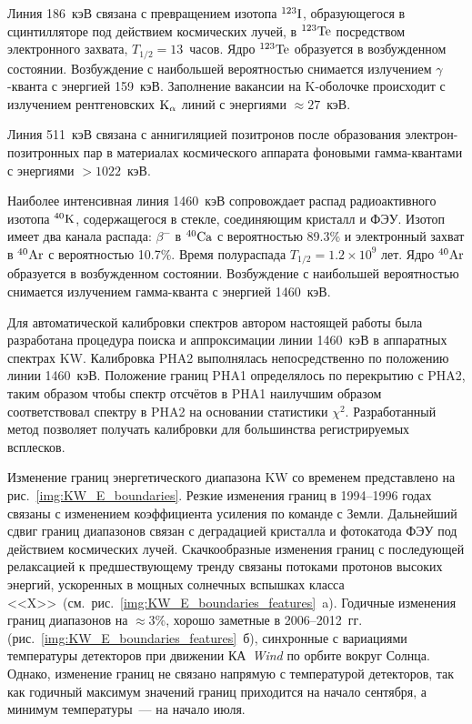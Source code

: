 Линия 186~кэВ связана с превращением изотопа $^{123}{\mathrm{I}}$, образующегося в 
сцинтилляторе под действием космических лучей, в $^{123}{\mathrm{Te}}$ посредством 
электронного захвата, $T_{1/2}=13$~часов. Ядро $^{123}{\mathrm{Te}}$ образуется в 
возбужденном состоянии. Возбуждение с наибольшей вероятностью снимается излучением $\gamma$-кванта 
с энергией 159~кэВ. Заполнение вакансии на K-оболочке происходит с излучением 
рентгеновских ${\mathrm{K}}_{\alpha}$ линий с энергиями $\approx 27$~кэВ.

Линия 511~кэВ связана с аннигиляцией позитронов после образования электрон-позитронных 
пар в материалах космического аппарата фоновыми гамма-квантами с энергиями $>1022$~кэВ.

Наиболее интенсивная линия 1460~кэВ сопровождает распад радиоактивного 
изотопа $^{40}{\mathrm{K}}$, содержащегося в стекле, соединяющим кристалл и ФЭУ. 
Изотоп имеет два канала распада: $\beta^{-}$ в $^{40}{\mathrm{Ca}}$ с 
вероятностью 89.3\% и электронный захват в $^{40}{\mathrm{Ar}}$ с вероятностью 10.7\%. 
Время полураспада $T_{1/2}=1.2\times10^9$ лет. Ядро $^{40}{\mathrm{Ar}}$ образуется в
возбужденном состоянии. Возбуждение с наибольшей вероятностью снимается 
излучением гамма-кванта с энергией 1460~кэВ.

Для автоматической калибровки спектров автором настоящей работы была 
разработана процедура поиска и аппроксимации линии 1460~кэВ в аппаратных спектрах 
KW. Калибровка PHA2 выполнялась непосредственно по положению 
линии 1460~кэВ. Положение границ PHA1 определялось по перекрытию с PHA2, 
таким образом чтобы спектр отсчётов в PHA1 наилучшим образом соответствовал спектру в PHA2 
на основании статистики $\chi^2$. Разработанный метод позволяет получать калибровки 
для большинства регистрируемых всплесков.

Изменение границ энергетического диапазона KW со временем представлено 
на рис.~\ref{img:KW_E_boundaries}. Резкие изменения границ в 1994--1996 годах 
связаны с изменением коэффициента усиления по команде с Земли. Дальнейший сдвиг 
границ диапазонов связан с деградацией кристалла и фотокатода ФЭУ под действием 
космических лучей. Скачкообразные изменения границ с последующей релаксацией 
к предшествующему тренду связаны потоками протонов высоких энергий, ускоренных в мощных 
солнечных вспышках класса <<X>>\ (см.~рис.~\ref{img:KW_E_boundaries_features}~a). 
Годичные изменения границ диапазонов на $\approx 3$\%, хорошо заметные в 2006--2012~гг. 
(рис.~\ref{img:KW_E_boundaries_features}~б), синхронные с вариациями температуры детекторов при движении 
КА~\textit{Wind} по орбите вокруг Солнца. Однако, изменение границ не связано напрямую 
с температурой детекторов, так как годичный максимум значений границ приходится на 
начало сентября, а минимум температуры~--- на начало июля. 

